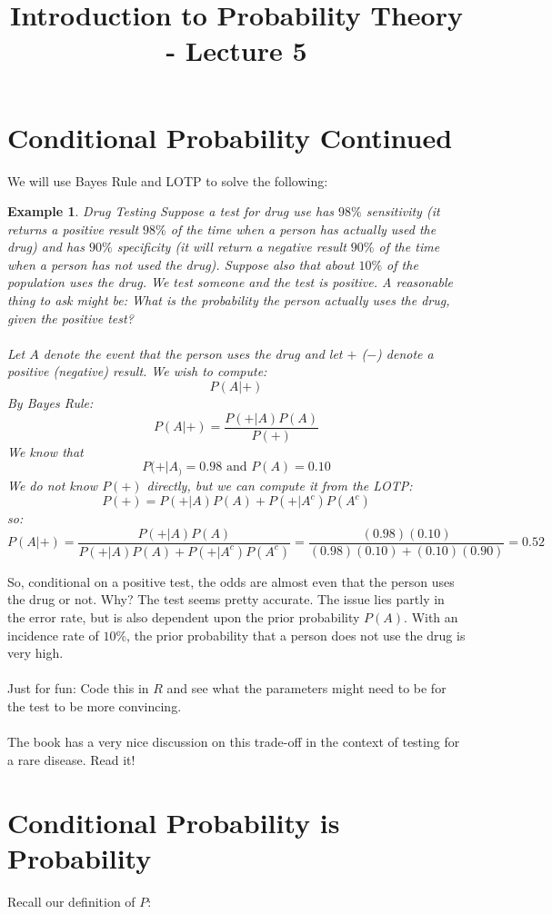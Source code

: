\documentclass[12pt]{article} %
\date{}
\title{Introduction to Probability Theory - Lecture 5}
\newtheorem{example}{Example}
\begin{document}
\maketitle
\section{Conditional Probability Continued}
We will use Bayes Rule and LOTP to solve the following:
\begin{example}{Drug Testing}
Suppose a test for drug use has $98 \%$ sensitivity (it returns a positive result $98\%$ of the time when a person has actually used the drug) and has $90\%$ specificity (it will return a negative result $90\%$ of the time when a person has not used the drug). Suppose also that about $10\%$ of the population uses the drug. We test someone and the test is positive. A reasonable thing to ask might be: What is the probability the person actually uses the drug, given the positive test?\\\\
Let $A$ denote the event that the person uses the drug and let $+$ ($-$)  denote a positive (negative) result. We wish to compute:
$$P(A|+)$$
By Bayes Rule:
$$P(A|+) = \frac{P(+|A)P(A)}{P(+)}$$
We know that
$$P(+|A_) = 0.98 \textrm{ and } P(A) =0.10$$
We do not know $P(+)$ directly, but we can compute it from the LOTP:
$$P(+) = P(+|A)P(A) + P(+|A^c)P(A^c)$$
so:
$$P(A|+) = \frac{P(+|A)P(A)}{P(+|A)P(A) + P(+|A^c)P(A^c)} = \frac{(0.98)(0.10)}{(0.98)(0.10)+(0.10)(0.90)} = 0.52$$
\end{example}
So, conditional on a positive test, the odds are almost even that the person uses the drug or not. Why? The test seems pretty accurate. The issue lies partly in the error rate, but is also dependent upon the prior probability $P(A)$. With an incidence rate of $10\%$, the prior probability that a person does not use the drug is very high.\\\\
Just for fun: Code this in $R$ and see what the parameters might need to be for the test to be more convincing.\\\\
The book has a very nice discussion on this trade-off in the context of testing for a rare disease. Read it!
\section{Conditional Probability is Probability}
Recall our definition of $P$:\\
\end{document}
